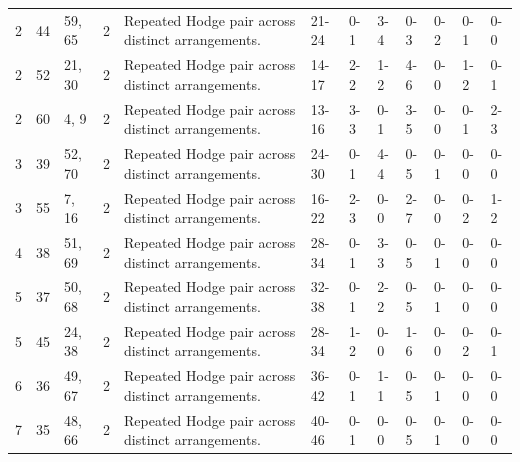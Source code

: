 \begin{tabular}{rrlrllllllll}
2 & 44 & 59, 65 & 2 & Repeated Hodge pair across distinct arrangements. & 21-24 & 0-1 & 3-4 & 0-3 & 0-2 & 0-1 & 0-0 \\
2 & 52 & 21, 30 & 2 & Repeated Hodge pair across distinct arrangements. & 14-17 & 2-2 & 1-2 & 4-6 & 0-0 & 1-2 & 0-1 \\
2 & 60 & 4, 9 & 2 & Repeated Hodge pair across distinct arrangements. & 13-16 & 3-3 & 0-1 & 3-5 & 0-0 & 0-1 & 2-3 \\
3 & 39 & 52, 70 & 2 & Repeated Hodge pair across distinct arrangements. & 24-30 & 0-1 & 4-4 & 0-5 & 0-1 & 0-0 & 0-0 \\
3 & 55 & 7, 16 & 2 & Repeated Hodge pair across distinct arrangements. & 16-22 & 2-3 & 0-0 & 2-7 & 0-0 & 0-2 & 1-2 \\
4 & 38 & 51, 69 & 2 & Repeated Hodge pair across distinct arrangements. & 28-34 & 0-1 & 3-3 & 0-5 & 0-1 & 0-0 & 0-0 \\
5 & 37 & 50, 68 & 2 & Repeated Hodge pair across distinct arrangements. & 32-38 & 0-1 & 2-2 & 0-5 & 0-1 & 0-0 & 0-0 \\
5 & 45 & 24, 38 & 2 & Repeated Hodge pair across distinct arrangements. & 28-34 & 1-2 & 0-0 & 1-6 & 0-0 & 0-2 & 0-1 \\
6 & 36 & 49, 67 & 2 & Repeated Hodge pair across distinct arrangements. & 36-42 & 0-1 & 1-1 & 0-5 & 0-1 & 0-0 & 0-0 \\
7 & 35 & 48, 66 & 2 & Repeated Hodge pair across distinct arrangements. & 40-46 & 0-1 & 0-0 & 0-5 & 0-1 & 0-0 & 0-0 \\
\bottomrule
\end{tabular}
